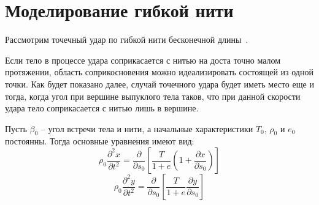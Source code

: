 \section{Моделирование гибкой нити}\label{sec:model-fibers}
Рассмотрим точечный удар по гибкой нити бесконечной длины~\cite{rakhmatulin}.

Если тело в процессе удара соприкасается с нитью на доста точно малом протяжении, область соприкосновения можно
идеализировать состоящей из одной точки.
Как будет показано далее, случай точечного удара будет иметь место еще и тогда, когда угол при вершине выпуклого
тела таков, что при данной скорости удара тело соприкасается с нитью лишь в вершине.

Пусть $\beta_0$ -- угол встречи тела и нити, а начальные характеристики $T_0$, $\rho_0$ и $e_0$ постоянны.
Тогда основные уравнения имеют вид:
\begin{equation}
    \rho_0 \dfrac{\partial^2 x}{\partial t^2} = \dfrac{\partial}{\partial s_0} \left[ \dfrac{T}{1 + e} \left( 1 + \dfrac{\partial x}{\partial s_0} \right) \right]
\end{equation}
\begin{equation}
    \rho_0 \dfrac{\partial^2 y}{\partial t^2} = \dfrac{\partial}{\partial s_0} \left[ \dfrac{T}{1 + e} \dfrac{\partial y}{\partial s_0} \right]
\end{equation}